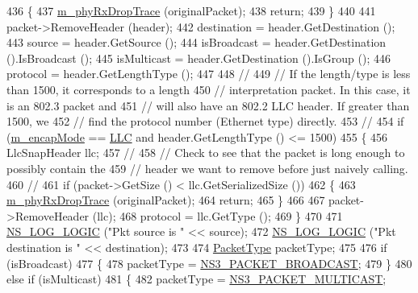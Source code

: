 \begin{DoxyCode}
436     \{
437       \hyperlink{classns3_1_1FdNetDevice_ab0049e3c36f1916a8b15de5446ce192c}{m\_phyRxDropTrace} (originalPacket);
438       \textcolor{keywordflow}{return};
439     \}
440 
441   packet->RemoveHeader (header);
442   destination = header.GetDestination ();
443   source = header.GetSource ();
444   isBroadcast = header.GetDestination ().IsBroadcast ();
445   isMulticast = header.GetDestination ().IsGroup ();
446   protocol = header.GetLengthType ();
447 
448   \textcolor{comment}{//}
449   \textcolor{comment}{// If the length/type is less than 1500, it corresponds to a length}
450   \textcolor{comment}{// interpretation packet.  In this case, it is an 802.3 packet and}
451   \textcolor{comment}{// will also have an 802.2 LLC header.  If greater than 1500, we}
452   \textcolor{comment}{// find the protocol number (Ethernet type) directly.}
453   \textcolor{comment}{//}
454   \textcolor{keywordflow}{if} (\hyperlink{classns3_1_1FdNetDevice_aa5d97abfd57576f6b80423ac764e5cc8}{m\_encapMode} == \hyperlink{classns3_1_1FdNetDevice_abdacbf10c181f50998a98e7688016618ac6f7f5fa39999c05c1b1c2c5e5dd8889}{LLC} and header.GetLengthType () <= 1500)
455     \{
456       LlcSnapHeader llc;
457       \textcolor{comment}{//}
458       \textcolor{comment}{// Check to see that the packet is long enough to possibly contain the}
459       \textcolor{comment}{// header we want to remove before just naively calling.}
460       \textcolor{comment}{//}
461       \textcolor{keywordflow}{if} (packet->GetSize () < llc.GetSerializedSize ())
462         \{
463           \hyperlink{classns3_1_1FdNetDevice_ab0049e3c36f1916a8b15de5446ce192c}{m\_phyRxDropTrace} (originalPacket);
464           \textcolor{keywordflow}{return};
465         \}
466 
467       packet->RemoveHeader (llc);
468       protocol = llc.GetType ();
469     \}
470 
471   \hyperlink{group__logging_ga88acd260151caf2db9c0fc84997f45ce}{NS\_LOG\_LOGIC} (\textcolor{stringliteral}{"Pkt source is "} << source);
472   \hyperlink{group__logging_ga88acd260151caf2db9c0fc84997f45ce}{NS\_LOG\_LOGIC} (\textcolor{stringliteral}{"Pkt destination is "} << destination);
473 
474   \hyperlink{classns3_1_1NetDevice_ace65153f09144f55a0d3e702fc29d6b2}{PacketType} packetType;
475 
476   \textcolor{keywordflow}{if} (isBroadcast)
477     \{
478       packetType = \hyperlink{classns3_1_1NetDevice_ace65153f09144f55a0d3e702fc29d6b2a851cdec39029ae1f3de8955e9b33eb9c}{NS3\_PACKET\_BROADCAST};
479     \}
480   \textcolor{keywordflow}{else} \textcolor{keywordflow}{if} (isMulticast)
481     \{
482       packetType = \hyperlink{classns3_1_1NetDevice_ace65153f09144f55a0d3e702fc29d6b2a46d4c29c98b4c198f24310ce69f43dc3}{NS3\_PACKET\_MULTICAST};

\end{DoxyCode}
